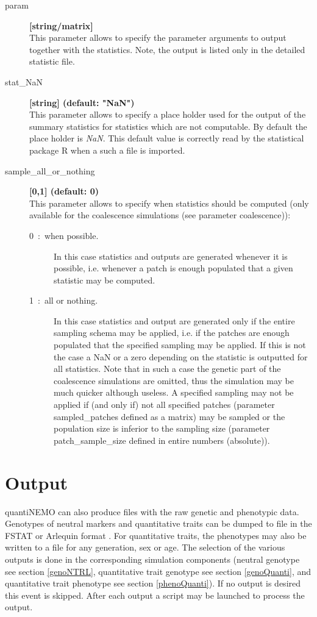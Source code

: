 \documentclass[letterpaper,12pt,oneside]{book}
\begin{document}
\begin{description}
\item[param] \textbf{[string/matrix]}\\
This parameter allows to specify the parameter arguments to output together with the statistics. Note, the output is listed only in the detailed statistic file.

\item[stat\_NaN] \textbf{[string] (default: "NaN")}\\
This parameter allows to specify a place holder used for the output of the summary statistics for statistics which are not computable. By default the place holder is \textit{NaN}. This default value is correctly read by the statistical package R when a such a file is imported.

\item[sample\_all\_or\_nothing] \textbf{[0,1] (default: 0)}\\
This parameter allows to specify when statistics should be computed (only available for the coalescence simulations (see parameter \textsf{coalescence})):
\begin{description}
\item[0~:~when possible.] In this case statistics and outputs are generated whenever it is possible, i.e. whenever a patch is enough populated that a given statistic may be computed.
\item[1~:~all or nothing.] In this case statistics and output are generated only if the entire sampling schema may be applied, i.e. if the patches are enough populated that the specified sampling may be applied. If this is not the case a NaN or a zero depending on the statistic is outputted for all statistics. Note that in such a case the genetic part of the coalescence simulations are omitted, thus the simulation may be much quicker although useless. A specified sampling may not be applied if (and only if) not all specified patches (parameter \textsf{sampled\_patches} defined as a matrix) may be sampled or the population size is inferior to the sampling size (parameter \textsf{patch\_sample\_size} defined in entire numbers (absolute)).
\end{description}
\end{description}


\section{Output}\label{3output}
quantiNEMO can also produce files with the raw genetic and phenotypic data. Genotypes of neutral markers and quantitative traits can be dumped to file in the FSTAT \citep{Goudet_1995} or Arlequin format \citep{Excoffier_2010}. For quantitative traits, the phenotypes may also be written to a file for any generation, sex or age. The selection of the various outputs is done in the corresponding simulation components (neutral genotype see section \ref{genoNTRL}, quantitative trait genotype see section \ref{genoQuanti}, and quantitative trait phenotype see section \ref{phenoQuanti}). If no output is desired this event is skipped. After each output a script may be launched to process the output. 
\end{document}
